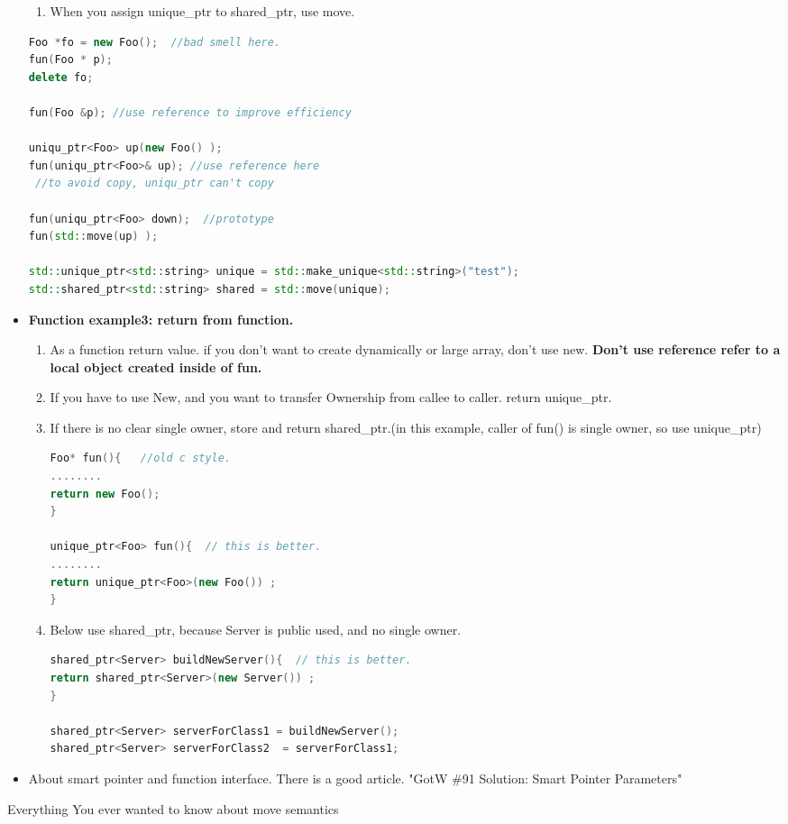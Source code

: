 \documentclass[a4paper,12pt,twoside]{book}
\begin{document}
\begin{itemize}
\begin{enumerate}
\item When you assign unique\_ptr to shared\_ptr, use move.
\end{enumerate}

\begin{lstlisting}[frame=single, language=c++]
Foo *fo = new Foo();  //bad smell here.
fun(Foo * p);
delete fo;

fun(Foo &p); //use reference to improve efficiency

uniqu_ptr<Foo> up(new Foo() );
fun(uniqu_ptr<Foo>& up); //use reference here
 //to avoid copy, uniqu_ptr can't copy

fun(uniqu_ptr<Foo> down);  //prototype
fun(std::move(up) );

std::unique_ptr<std::string> unique = std::make_unique<std::string>("test");
std::shared_ptr<std::string> shared = std::move(unique);
\end{lstlisting}

\item \textbf{Function example3: return from function.}
\begin{enumerate}
\item As a function return value. if you don't want to create dynamically or large array, don't use new. \textbf{Don't  use reference refer to a local object created inside of fun.}

\item If you have to use New, and you want to transfer Ownership from callee to caller. return unique\_ptr.

\item If there is no clear single owner, store and return shared\_ptr.(in this example, caller of fun() is single owner, so use unique\_ptr)

\begin{lstlisting}[frame=single, language=c++]
Foo* fun(){   //old c style.
........
return new Foo();
}

unique_ptr<Foo> fun(){  // this is better.
........
return unique_ptr<Foo>(new Foo()) ;
}
\end{lstlisting}

\item Below use shared\_ptr, because Server is public used, and no single owner.
\begin{lstlisting}[frame=single, language=c++]
shared_ptr<Server> buildNewServer(){  // this is better.
return shared_ptr<Server>(new Server()) ;
}

shared_ptr<Server> serverForClass1 = buildNewServer();
shared_ptr<Server> serverForClass2  = serverForClass1;
\end{lstlisting}

\end{enumerate}

\item About smart pointer and function interface. There is a good article. "GotW \#91 Solution: Smart Pointer Parameters"
\end{itemize}
Everything You ever wanted to know about move semantics
\end{document}
